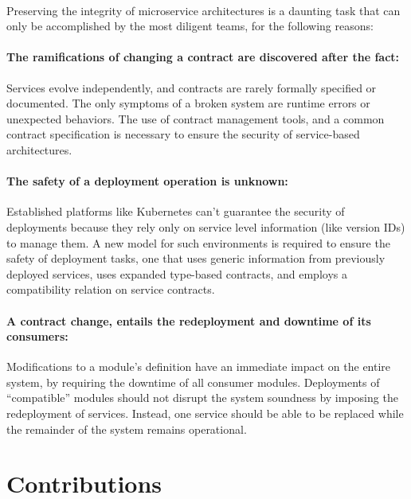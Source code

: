 \paragraph{}

Preserving the integrity of microservice architectures is a daunting task that can only be accomplished by the most diligent teams, for the following reasons:

\paragraph{ The ramifications of changing a contract are discovered after the fact:}
Services evolve independently, and contracts are rarely formally specified or documented.
The only symptoms of a broken system are runtime errors or unexpected behaviors.
The use of contract management tools, and a common contract specification is necessary to ensure the security of service-based architectures.

\paragraph{ The safety of a deployment operation is unknown:}
Established platforms like Kubernetes can't guarantee the security of deployments because they rely only on service level information (like version IDs) to manage them.
A new model for such environments is required to ensure the safety of deployment tasks, one that uses generic information from previously deployed services,
uses expanded type-based contracts, and employs a compatibility relation on service contracts.

\paragraph{ A contract change, entails the redeployment and downtime of its consumers:}
Modifications to a module's definition have an immediate impact on the entire system, by requiring the downtime of all consumer modules.
Deployments of “compatible” modules should not disrupt the system soundness by imposing the redeployment of services.
Instead, one service should be able to be replaced while the remainder of the system remains operational.

\section{Contributions} %
\label{sec:contributions}

